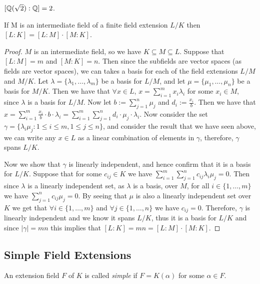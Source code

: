\begin{example}
	$[\mathbb Q(\sqrt 2): \mathbb Q] = 2$. 
\end{example}
\begin{theorem} \label{thm:tower-theorem}
    If M is an intermediate field of a finite field extension $L/K$ then
$
    [L:K] = [L:M]\cdot[M:K]
$. 
\end{theorem}
\begin{proof}
$M$ is an intermediate field, so we have $K \subseteq M \subseteq L$. Suppose that $[L:M]=m$ and $[M:K]=n$. Then since the subfields are vector spaces (as fields are vector spaces), we can takes a basis for each of the field extensions $L/M$ and $M/K$.
Let $\lambda = \{\lambda_1,\dots,\lambda_m\}$ be a basis for $L/M$, and let $\mu = \{\mu_1,\dots,\mu_n\}$ be a basis for $M/K$. Then we have that $\forall x \in L$, $x = \sum^m_{i=1}x_i\lambda_i$ for some $x_i \in M$, since $\lambda$ is a basis for $L/M$. Now let $b:=\sum^n_{j=1}\mu_j$ and $d_i:=\frac{x_i}{b}$. Then we have that $x=\sum^m_{i=1}\frac{x_i}{b}\cdot b \cdot \lambda_i = \sum^m_{i=1}\sum^n_{j=1}d_i\cdot \mu_j \cdot \lambda_i$. Now consider the set $\gamma=\{\lambda_i\mu_j : 1\leq i \leq m, 1\leq j \leq n\}$, and consider the result that we have seen above, we can write any $x \in L$ as a linear combination of elements in $\gamma$, therefore, $\gamma$ spans $L/K$.

Now we show that $\gamma$ is linearly independent, and hence confirm that it is a basis for $L/K$. Suppose that for some $c_{ij} \in K$ we have $\sum^m_{i=1} \sum^n_{j=1} c_{ij}\lambda_i\mu_j = 0 $. Then since $\lambda$ is a linearly independent set, as $\lambda$ is a basis, over $M$, for all $i \in \{1,\dots,m\}$ we have $\sum^n_{j=1} c_{ij}\mu_j = 0 $. By seeing that $\mu$ is also a linearly independent set over $K$ we get that $\forall i \in \{1,\dots,m\}$ and $\forall j \in \{1,\dots,n\}$ we have $c_{ij} = 0$. Therefore, $\gamma$ is linearly independent and we  know it spans $L/K$, thus it is a basis for $L/K$ and since $|\gamma|=mn$ this implies that $[L:K] = mn = [L:M]\cdot[M:K]$.
\end{proof}

\subsection{Simple Field Extensions}
\begin{definition}
An extension field \(F\) of \(K\) is called \textit{simple} if \(F = K(\alpha)\) for some \(\alpha \in F\).
\end{definition}

